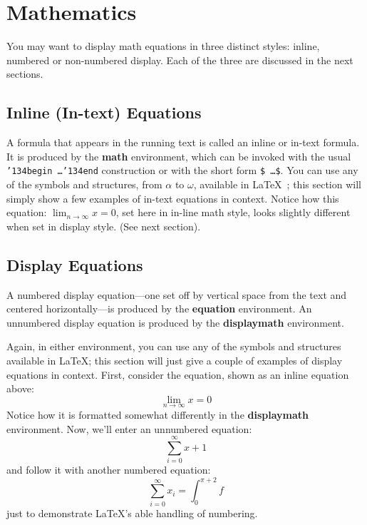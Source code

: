 \chapter{Mathematics}
\label{ch:math}

You may want to display math equations in three distinct styles:
inline, numbered or non-numbered display. Each of the three are
discussed in the next sections.

\section{Inline (In-text) Equations}
\label{sec:inline-math}

A formula that appears in the running text is called an inline or
in-text formula. It is produced by the \textbf{math} environment, which
can be invoked with the usual
\texttt{{\char'134}begin\,\ldots{\char'134}end} construction or with the
short form \texttt{\$\,\ldots\$}. You can use any of the symbols and
structures, from $\alpha$ to $\omega$, available in \LaTeX~\cite{Lamport:LaTeX};
this section will simply show a few examples of in-text equations in
context. Notice how this equation:
\begin{math}
  \lim_{n\rightarrow \infty}x=0
\end{math},
set here in in-line math style, looks slightly different when set in
display style. (See next section).

\section{Display Equations}
\label{sec:display-math}

A numbered display equation---one set off by vertical space from the text
and centered horizontally---is produced by the \textbf{equation}
environment. An unnumbered display equation is produced by the
\textbf{displaymath} environment.

Again, in either environment, you can use any of the symbols and
structures available in \LaTeX\@; this section will just give a couple
of examples of display equations in context. First, consider the
equation, shown as an inline equation above:
\begin{equation}
  \label{eq:lim}
  \lim_{n\rightarrow \infty}x=0
\end{equation}
Notice how it is formatted somewhat differently in the
\textbf{displaymath}
environment. Now, we'll enter an unnumbered equation:
\begin{displaymath}
  \sum_{i=0}^{\infty} x + 1
\end{displaymath}
and follow it with another numbered equation:
\begin{equation}
  \label{eq:sum}
  \sum_{i=0}^{\infty}x_i=\int_{0}^{\pi+2} f
\end{equation}
just to demonstrate \LaTeX's able handling of numbering.
